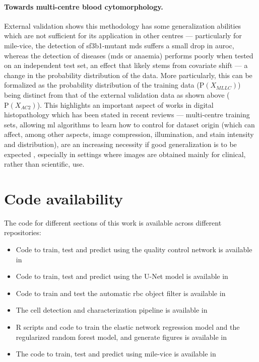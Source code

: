 \paragraph{Towards multi-centre blood cytomorphology.} External validation shows this methodology has some generalization abilities which are not sufficient for its application in other centres --- particularly for \ac{mile-vice}, the detection of \ac{sf3b1}-mutant \ac{mds} suffers a small drop in \ac{auroc}, whereas the detection of diseases (\ac{mds} or anaemia) performs poorly when tested on an independent test set, an effect that likely stems from covariate shift --- a change in the probability distribution of the data. More particularly, this can be formalized as the probability distribution of the training data ($\mathrm{P}(X_{MLLC})$) being distinct from that of the external validation data as shown above ($\mathrm{P}(X_{AC2})$). This highlights an important aspect of works in digital histopathology which has been stated in recent reviews --- multi-centre training sets, allowing \ac{ml} algorithms to learn how to control for dataset origin (which can affect, among other aspects, image compression, illumination, and stain intensity and distribution), are an increasing necessity if good generalization is to be expected \cite{Van_der_Laak2021-id}, especially in settings where images are obtained mainly for clinical, rather than scientific, use.

\section{Code availability}

The code for different sections of this work is available across different repositories:

\begin{itemize}
    \item Code to train, test and predict using the quality control network is available in \url{}
    \item Code to train, test and predict using the U-Net model is available in \url{}
    \item Code to train and test the automatic \ac{rbc} object filter is available in \url{}
    \item The cell detection and characterization pipeline is available in \url{}
    \item R scripts and code to train the elastic network regression model and the regularized random forest model, and generate figures is available in \url{}
    \item The code to train, test and predict using \ac{mile-vice} is available in \url{}
\end{itemize}

